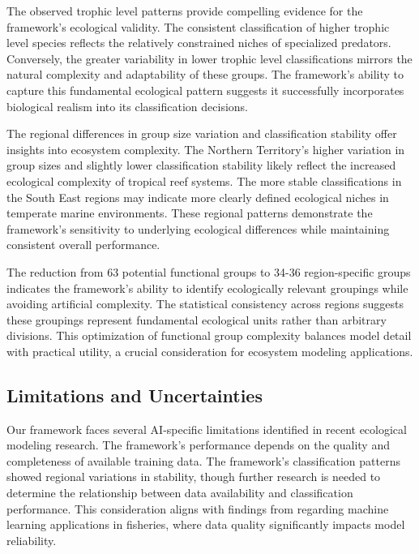 The observed trophic level patterns provide compelling evidence for the framework's ecological validity. The consistent classification of higher trophic level species reflects the relatively constrained niches of specialized predators. Conversely, the greater variability in lower trophic level classifications mirrors the natural complexity and adaptability of these groups. The framework's ability to capture this fundamental ecological pattern suggests it successfully incorporates biological realism into its classification decisions.

The regional differences in group size variation and classification stability offer insights into ecosystem complexity. The Northern Territory's higher variation in group sizes and slightly lower classification stability likely reflect the increased ecological complexity of tropical reef systems. The more stable classifications in the South East regions may indicate more clearly defined ecological niches in temperate marine environments. These regional patterns demonstrate the framework's sensitivity to underlying ecological differences while maintaining consistent overall performance.

The reduction from 63 potential functional groups to 34-36 region-specific groups indicates the framework's ability to identify ecologically relevant groupings while avoiding artificial complexity. The statistical consistency across regions suggests these groupings represent fundamental ecological units rather than arbitrary divisions. This optimization of functional group complexity balances model detail with practical utility, a crucial consideration for ecosystem modeling applications.


\subsection{Limitations and Uncertainties}

Our framework faces several AI-specific limitations identified in recent ecological modeling research. The framework's performance depends on the quality and completeness of available training data. The framework's classification patterns showed regional variations in stability, though further research is needed to determine the relationship between data availability and classification performance. This consideration aligns with findings from \cite{Kuhn2024} regarding machine learning applications in fisheries, where data quality significantly impacts model reliability.


